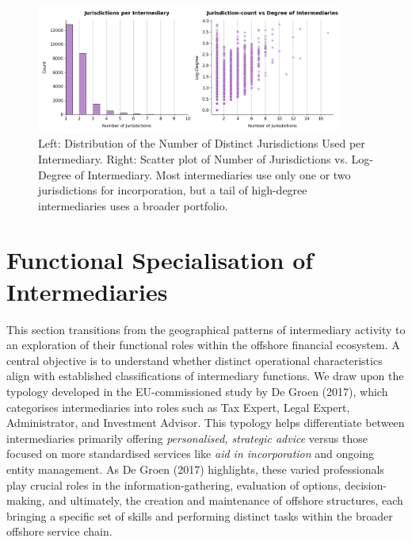 \begin{figure}[htbp]
    \centering
    \includegraphics[width=0.9\textwidth]{images/Geography_Distribution_of_Jurisdictions_by_Intermediary.png} %
    \caption{Left: Distribution of the Number of Distinct Jurisdictions Used per Intermediary. Right: Scatter plot of Number of Jurisdictions vs. Log-Degree of Intermediary. Most intermediaries use only one or two jurisdictions for incorporation, but a tail of high-degree intermediaries uses a broader portfolio.}
    \label{fig:geography_distribution_jurisdictions_by_intermediary}
\end{figure}


\section{Functional Specialisation of Intermediaries}
\label{sec:functional_specialisation}

This section transitions from the geographical patterns of intermediary activity to an exploration of their functional roles within the offshore financial ecosystem. A central objective is to understand whether distinct operational characteristics align with established classifications of intermediary functions. We draw upon the typology developed in the EU-commissioned study by De Groen (2017), which categorises intermediaries into roles such as Tax Expert, Legal Expert, Administrator, and Investment Advisor. This typology helps differentiate between intermediaries primarily offering \textit{personalised, strategic advice} versus those focused on more standardised services like \textit{aid in incorporation} and ongoing entity management. As De Groen (2017) highlights, these varied professionals play crucial roles in the information-gathering, evaluation of options, decision-making, and ultimately, the creation and maintenance of offshore structures, each bringing a specific set of skills and performing distinct tasks within the broader offshore service chain.

